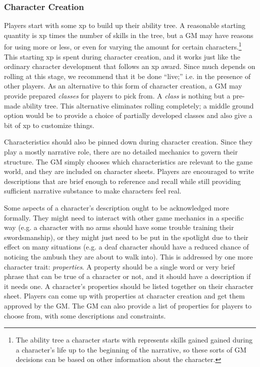 \documentclass[12pt]{article}
\begin{document}
\subsubsection{Character Creation}
Players start with some xp to build up their ability tree.
A reasonable starting quantity is xp times the number of skills in the tree,
but a GM may have reasons for using more or less, or even for varying the amount for certain characters.\footnote{
The ability tree a character starts with represents skills gained
gained during a character's life up to the beginning of the narrative,
so these sorts of GM decisions can be based on other information about the character.}
This starting xp is spent during character creation, and it works just like the ordinary character development that follows an xp award.
Since much depends on rolling at this stage, we recommend that it be done ``live;'' i.e. in the presence of other players.
As an alternative to this form of character creation, a GM may provide prepared \emph{classes} for players to pick from.
A \emph{class} is nothing but a pre-made ability tree.
This alternative eliminates rolling completely; a middle ground option would be to provide a choice
of partially developed classes and also give a bit of xp to customize things.

Characteristics should also be pinned down during character creation.
Since they play a mostly narrative role, there are no detailed mechanics to govern their structure.
The GM simply chooses which characteristics are relevant to the game world, and they are included on character sheets.
Players are encouraged to write descriptions that are brief enough to reference and recall while still
providing sufficient narrative substance to make characters feel real.


Some aspects of a character's description ought to be acknowledged more formally.
They might need to interact with other game mechanics
in a specific way (e.g. a character with no arms should have some trouble training their swordsmanship),
or they might just need to be put in the spotlight due to their effect on many situations
(e.g. a deaf character should have a reduced chance of noticing the ambush they are about to walk into).
This is addressed by one more character trait: \emph{properties}.
A property should be a single word or very brief phrase that can be true of a character or not,
and it should have a description if it needs one.
A character's properties should be listed together on their character sheet.
Players can come up with properties at character creation and get them approved by the GM.
The GM can also provide a list of properties for players to choose from, with some descriptions and constraints.
\end{document}
